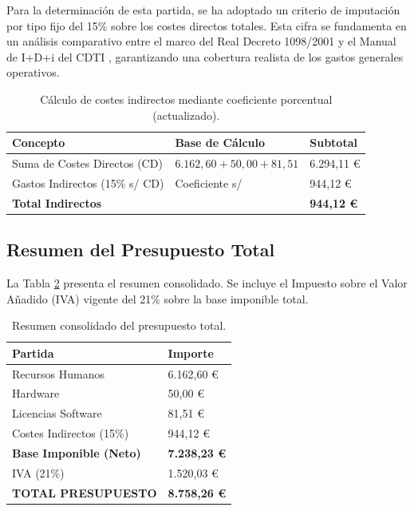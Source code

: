 \documentclass[11pt]{article}
\begin{document}
Para la determinación de esta partida, se ha adoptado un criterio de imputación por tipo fijo del 15\% sobre los costes directos totales. Esta cifra se fundamenta en un análisis comparativo entre el marco del Real Decreto 1098/2001 \cite{boe_rd1098_2001} y el Manual de I+D+i del CDTI \cite{cdti_manual_2025}, garantizando una cobertura realista de los gastos generales operativos.

\begin{table}[h!]
\centering
\small
\begin{tabularx}{\textwidth}{lXX}
\toprule
\textbf{Concepto} & \textbf{Base de Cálculo} & \textbf{Subtotal} \\ \midrule
Suma de Costes Directos (CD) & $6.162,60 + 50,00 + 81,51$ & 6.294,11 \euro \\
Gastos Indirectos (15\% s/ CD) & Coeficiente s/ \cite{boe_rd1098_2001, cdti_manual_2025} & 944,12 \euro \\ \midrule
\textbf{Total Indirectos} & & \textbf{944,12 \euro} \\ \bottomrule
\end{tabularx}
\caption{Cálculo de costes indirectos mediante coeficiente porcentual (actualizado).}
\label{tab:indirectos}
\end{table}

\subsection{Resumen del Presupuesto Total}

La Tabla \ref{tab:total} presenta el resumen consolidado. Se incluye el Impuesto sobre el Valor Añadido (IVA) vigente del 21\% sobre la base imponible total.

\begin{table}[h!]
\centering
\small
\begin{tabularx}{0.7\textwidth}{lX}
\toprule
\textbf{Partida} & \textbf{Importe} \\ \midrule
Recursos Humanos & 6.162,60 \euro \\
Hardware & 50,00 \euro \\
Licencias Software & 81,51 \euro \\
Costes Indirectos (15\%) & 944,12 \euro \\ \midrule
\textbf{Base Imponible (Neto)} & \textbf{7.238,23 \euro} \\
IVA (21\%) & 1.520,03 \euro \\ \midrule
\textbf{TOTAL PRESUPUESTO} & \textbf{8.758,26 \euro} \\ \bottomrule
\end{tabularx}
\caption{Resumen consolidado del presupuesto total.}
\label{tab:total}
\end{table}
\end{document}
